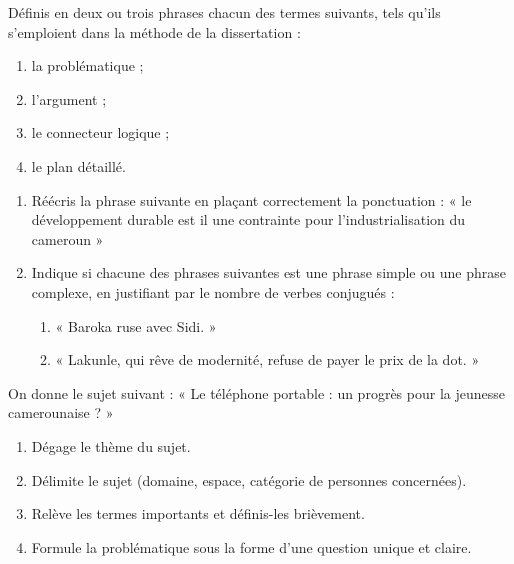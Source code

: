 \documentclass[11pt]{article}
\newcounter{popsec}
\newcounter{popsub}
\newcommand{\courssub}[1]{%
  \stepcounter{popsub}%
  \par\vspace{9pt}\noindent{\popxbold\fontsize{11.5}{13}\selectfont\color{popink}{\color{poporange}\thepopsec.\thepopsub}\hspace{6pt}#1}\par\nopagebreak\vspace{4pt}
}
\begin{document}
\begin{exercice}[Définitions]
Définis en deux ou trois phrases chacun des termes suivants, tels qu'ils s'emploient dans la méthode de la dissertation :
\begin{enumerate}
\item la problématique ;
\item l'argument ;
\item le connecteur logique ;
\item le plan détaillé.
\end{enumerate}
\end{exercice}

\begin{exercice}
\begin{enumerate}
\item Réécris la phrase suivante en plaçant correctement la ponctuation : « le développement durable est il une contrainte pour l'industrialisation du cameroun »
\item Indique si chacune des phrases suivantes est une phrase simple ou une phrase complexe, en justifiant par le nombre de verbes conjugués :
\begin{enumerate}
\item « Baroka ruse avec Sidi. »
\item « Lakunle, qui rêve de modernité, refuse de payer le prix de la dot. »
\end{enumerate}
\end{enumerate}
\end{exercice}

\courssub{Je m'entraîne}

\begin{exercice}
On donne le sujet suivant : « Le téléphone portable : un progrès pour la jeunesse camerounaise ? »
\begin{enumerate}
\item Dégage le thème du sujet.
\item Délimite le sujet (domaine, espace, catégorie de personnes concernées).
\item Relève les termes importants et définis-les brièvement.
\item Formule la problématique sous la forme d'une question unique et claire.
\end{enumerate}
\end{exercice}
\end{document}
